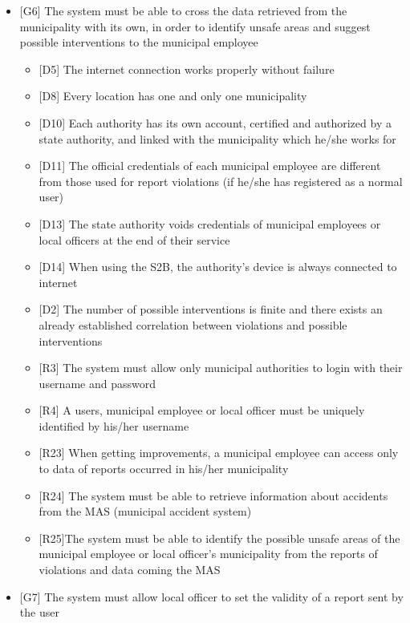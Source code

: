 \begin{itemize}
\begin{itemize}
							\end{itemize}
						\clearpage
						\item {[G6]}  The system must be able to cross the data retrieved from the municipality with its own, in order to identify unsafe areas and suggest possible interventions to the municipal employee
							\begin{itemize}
								\item {[D5]} The internet connection works properly without failure
								\item {[D8]} Every location has one and only one municipality
								\item {[D10]} Each authority has its own account, certified and authorized by a state authority, and linked with the municipality which he/she works for
								\item {[D11]} The official credentials of each municipal employee are different from those used for report violations (if he/she has registered as a normal user)
								\item {[D13]} The state authority voids credentials of municipal employees or local officers at the end of their service
								\item {[D14]} When using the S2B, the authority's device is always connected to internet
								\item {[D2]} The number of possible interventions is finite and there exists an already established correlation between violations and possible interventions
								\item {[R3]} The system must allow only municipal authorities to login with their username and password
								\item {[R4]} A users, municipal employee or local officer must be uniquely identified by his/her username
								\item {[R23]} When getting improvements, a municipal employee can access only to data of reports occurred in his/her municipality
								\item {[R24]} The system must be able to retrieve information about accidents from the MAS (municipal accident system)
								\item {[R25]}The system must be able to identify the possible unsafe areas of the municipal employee or local officer's municipality from the reports of violations and data coming the MAS
							\end{itemize}
						\item {[G7]} The system must allow local officer to set the validity of a report sent by the user

\end{itemize}
